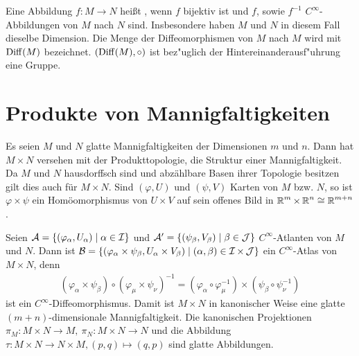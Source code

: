 \begin{Dfn}[Diffeomorphismus]
Eine Abbildung $f \colon M \to N$ hei\ss t , wenn $f$ bijektiv ist und $f$, sowie $f^{-1}$ $C^{\infty}$-Abbildungen von $M$ nach $N$ sind. Insbesondere haben $M$ und $N$ in diesem Fall dieselbe Dimension. Die Menge der Diffeomorphismen von $M$ nach $M$ wird mit $\operatorname{Diff}(M)$ bezeichnet. $(\operatorname{Diff}(M), \circ)$ ist bez"uglich der Hintereinanderausf"uhrung eine Gruppe.
\end{Dfn}



\section{Produkte von Mannigfaltigkeiten}

Es seien $M$ und $N$ glatte Mannigfaltigkeiten der Dimensionen $m$ und $n$. Dann hat $M \times N$ versehen mit der \gls{Produkttopologie}, die Struktur einer Mannigfaltigkeit. Da $M$ und $N$ hausdorffsch sind und abzählbare Basen ihrer Topologie besitzen gilt dies auch für $M \times N$.
Sind $(\varphi, U)$ und $(\psi, V)$ Karten von $M$ bzw. $N$, so ist $\varphi \times \psi$ ein Homöomorphismus von $U \times V$ auf sein offenes Bild in $\operatorname{\mathbb{R}}^m \times \operatorname{\mathbb{R}}^n \cong \operatorname{\mathbb{R}}^{m + n}$.

Seien $\mathcal A = \{(\varphi_{\alpha}, U_{\alpha}) \mid \alpha \in \operatorname{\mathcal{I}} \}$ und $\mathcal A' = \{(\psi_{\beta}, V_{\beta}) \mid \beta \in \operatorname{\mathcal{J}}\}$ $C^{\infty}$-Atlanten von $M$ und $N$. Dann ist $\mathcal B = \{(\varphi_{\alpha}\times\psi_{\beta},U_{\alpha}\times V_{\beta}) \mid (\alpha, \beta) \in \operatorname{\mathcal{I}} \times \operatorname{\mathcal{J}}\}$ ein $C^{\infty}$-Atlas von $M\times N$, denn 
\begin{align*}
  (\varphi_{\alpha} \times \psi_{\beta}) \circ (\varphi_{\mu} \times \psi_{\nu})^{-1} = (\varphi_{\alpha} \circ \varphi_{\mu}^{-1}) \times (\psi_{\beta} \circ \psi_{\nu}^{-1})
\end{align*}
ist ein $C^{\infty}$-Diffeomorphismus. Damit ist $M\times N$ in kanonischer Weise eine glatte $(m+n)$-dimensionale Mannigfaltigkeit. Die kanonischen Projektionen $\pi_M\colon M\times N \to M, \ \pi_N\colon M \times N \to N$ und die Abbildung $\tau \colon M \times N \to N \times M, (p,q) \mapsto (q,p)$ sind glatte Abbildungen.


